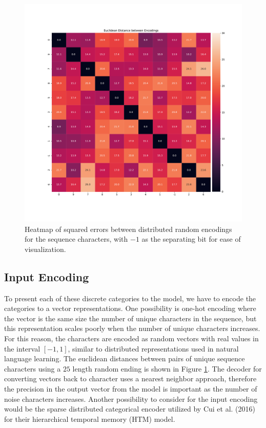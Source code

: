 \documentclass{article}
\begin{document}
\begin{figure}[!h]
    \centering
    \includegraphics[width=\linewidth]{../notebooks/matrix-distances.pdf}
    \caption{Heatmap of squared errors between distributed random encodings for the sequence characters, with $-1$ as the separating bit for ease of visualization.}
    \label{fig:encoding-distance}
\end{figure}

\subsection*{Input Encoding}

To present each of these discrete categories to the model, we have to encode the categories to a vector representations. One possibility is one-hot encoding where the vector is the same size the number of unique characters in the sequence, but this representation scales poorly when the number of unique characters increases. For this reason, the characters are encoded as random vectors with real values in the interval $\left[-1, 1\right]$, similar to distributed representations used in natural language learning. \cite{mikolov2013distributed} The euclidean distances between pairs of unique sequence characters using a $25$ length random ending is shown in Figure \ref{fig:encoding-distance}. The decoder for converting vectors back to character uses a nearest neighbor approach, therefore the precision in the output vector from the model is important as the number of noise characters increases. Another possibility to consider for the input encoding would be the sparse distributed categorical encoder utilized by Cui et al. (2016) for their hierarchical temporal memory (HTM) model.
\end{document}
